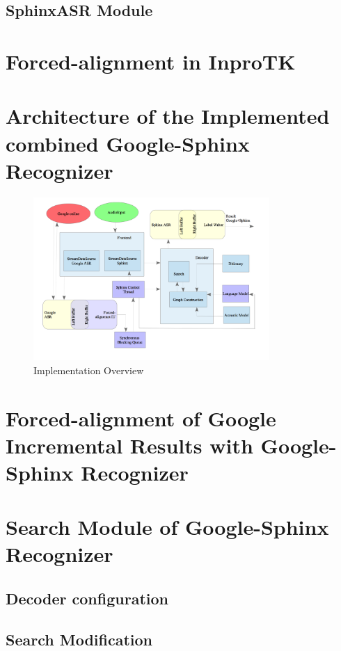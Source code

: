 \subsection {SphinxASR Module}

\section {Forced-alignment in InproTK}
\section {Architecture of the Implemented combined Google-Sphinx Recognizer}
\begin{figure}[htbp]
  \centering
    \includegraphics[width=0.8\textwidth]{images/architecture.png}
 \caption{Implementation Overview}
 
  \label{fig:Bild1}
\end {figure}
\section {Forced-alignment of Google Incremental Results with Google-Sphinx
Recognizer}
\section {Search Module of Google-Sphinx Recognizer}
\subsection {Decoder configuration}
\subsection {Search Modification}